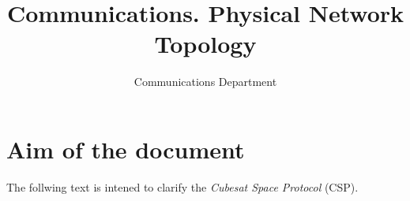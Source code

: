 \documentclass[12pt,a4paper]{article}
\author{Communications Department}
\title{Communications. Physical Network Topology}
\begin{document}
\section*{Aim of the document}
The follwing text is intened to clarify the \textit{Cubesat Space Protocol} (CSP). 
	
	
	
	
	
	{}
	
	
	
\end{document}
